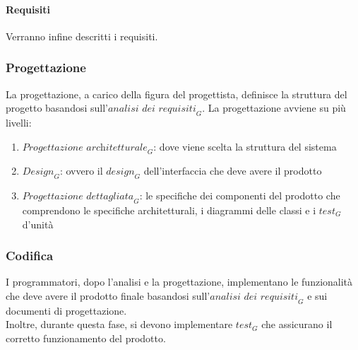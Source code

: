 \paragraph{Requisiti} 
Verranno infine descritti i requisiti.
\subsubsection{Progettazione}
La progettazione, a carico della figura del progettista, definisce la struttura del progetto basandosi sull'$\textit{analisi dei requisiti}_G$.
La progettazione avviene su più livelli:
\begin{enumerate}
    \item $\textit{Progettazione architetturale}_G$: dove viene scelta la struttura del sistema
    \item $\textit{Design}_G$: ovvero il $\textit{design}_G$ dell'interfaccia che deve avere il prodotto
    \item $\textit{Progettazione dettagliata}_G$: le specifiche dei componenti del prodotto che comprendono le specifiche architetturali, i diagrammi delle classi e i $\textit{test}_G$ d'unità
\end{enumerate}
\subsubsection{Codifica}
I programmatori, dopo l'analisi e la progettazione, implementano le funzionalità che deve avere il prodotto finale basandosi sull'$\textit{analisi dei requisiti}_G$ e sui documenti di progettazione.\\
Inoltre, durante questa fase, si devono implementare $\textit{test}_G$ che assicurano il corretto funzionamento del prodotto.
